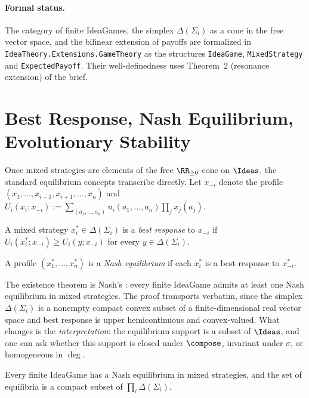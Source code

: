 \paragraph{Formal status.} The category of finite IdeaGames, the simplex
$\Delta(\Sigma_i)$ as a cone in the free vector space, and the bilinear
extension of payoffs are formalized in
\texttt{IdeaTheory.Extensions.GameTheory} as the structures
\texttt{IdeaGame}, \texttt{MixedStrategy} and \texttt{ExpectedPayoff}.
Their well-definedness uses Theorem~2 (resonance extension) of the brief.

\section{Best Response, Nash Equilibrium, Evolutionary Stability}
\label{sec:nash-ess}

Once mixed strategies are elements of the free $\RR_{\geq 0}$-cone on
$\Ideas$, the standard equilibrium concepts transcribe directly. Let
$x_{-i}$ denote the profile $(x_1,\dots,x_{i-1},x_{i+1},\dots,x_n)$ and
$U_i(x_i;x_{-i}) := \sum_{(a_1,\dots,a_n)} u_i(a_1,\dots,a_n)\prod_j x_j(a_j)$.

\begin{definition}
A mixed strategy $x_i^\ast \in \Delta(\Sigma_i)$ is a \emph{best response}
to $x_{-i}$ if $U_i(x_i^\ast;x_{-i}) \geq U_i(y;x_{-i})$ for every
$y\in\Delta(\Sigma_i)$.
\end{definition}

\begin{definition}
A profile $(x_1^\ast,\dots,x_n^\ast)$ is a \emph{Nash equilibrium} if each
$x_i^\ast$ is a best response to $x_{-i}^\ast$.
\end{definition}

The existence theorem is Nash's \citep{Nash1950}: every finite IdeaGame
admits at least one Nash equilibrium in mixed strategies. The proof
transports verbatim, since the simplex $\Delta(\Sigma_i)$ is a nonempty
compact convex subset of a finite-dimensional real vector space and best
response is upper hemicontinuous and convex-valued. What changes is the
\emph{interpretation}: the equilibrium support is a subset of $\Ideas$, and
one can ask whether this support is closed under $\compose$, invariant
under $\sigma$, or homogeneous in $\deg$.

\begin{theorem}
\label{thm:nash}
Every finite IdeaGame has a Nash equilibrium in mixed strategies, and the
set of equilibria is a compact subset of $\prod_i \Delta(\Sigma_i)$.
\end{theorem}

